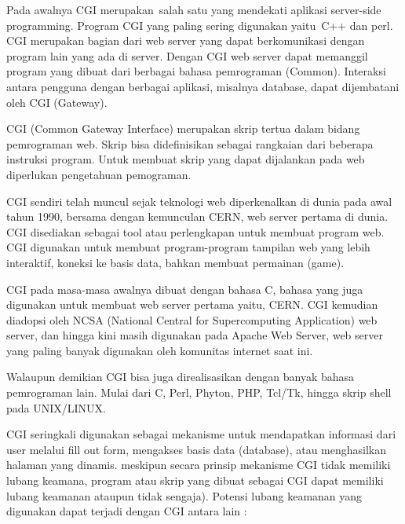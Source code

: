 \documentclass{wileySix}
\begin{document}
\vspace{12pt}
Pada awalnya CGI merupakan~salah satu yang mendekati aplikasi server-side programming.  Program CGI yang paling sering digunakan yaitu~C++ dan perl.  CGI merupakan bagian dari web server yang dapat berkomunikasi dengan program lain yang ada di server. Dengan CGI web server dapat memanggil program yang dibuat dari berbagai bahasa pemrograman (Common). Interaksi antara pengguna dengan berbagai aplikasi, misalnya database, dapat dijembatani oleh CGI (Gateway). \par
\vspace{12pt}
CGI (Common Gateway Interface) merupakan skrip tertua dalam bidang pemrograman web. Skrip bisa didefinisikan sebagai rangkaian dari beberapa instruksi program. Untuk membuat skrip yang dapat dijalankan pada web diperlukan pengetahuan pemograman. \par
\vspace{12pt}
CGI sendiri telah muncul sejak teknologi web diperkenalkan di dunia pada awal tahun 1990, bersama dengan kemunculan CERN, web server pertama di dunia. CGI disediakan sebagai tool atau perlengkapan untuk membuat program web. CGI digunakan untuk membuat program-program tampilan web yang lebih interaktif, koneksi ke basis data, bahkan membuat permainan (game). \par
\vspace{12pt}
CGI pada masa-masa awalnya dibuat dengan bahasa C, bahasa yang juga digunakan untuk membuat web server pertama yaitu, CERN. CGI kemudian diadopsi oleh NCSA (National Central for Supercomputing Application) web server, dan hingga kini masih digunakan pada Apache Web Server, web server yang paling banyak digunakan oleh komunitas internet saat ini. \par
\vspace{12pt}
Walaupun demikian CGI bisa juga direalisasikan dengan banyak bahasa pemrograman lain. Mulai dari C, Perl, Phyton, PHP, Tcl/Tk, hingga skrip shell pada UNIX/LINUX. \par
\vspace{12pt}
CGI seringkali digunakan sebagai mekanisme untuk mendapatkan informasi dari user melalui fill out form, mengakses basis data (database), atau menghasilkan halaman yang dinamis. meskipun secara prinsip mekanisme CGI tidak memiliki lubang keamana, program atau skrip yang dibuat sebagai CGI dapat memiliki lubang keamanan ataupun tidak sengaja). Potensi lubang keamanan yang digunakan dapat terjadi dengan CGI antara lain : \par
\noindent 
\end{document}
